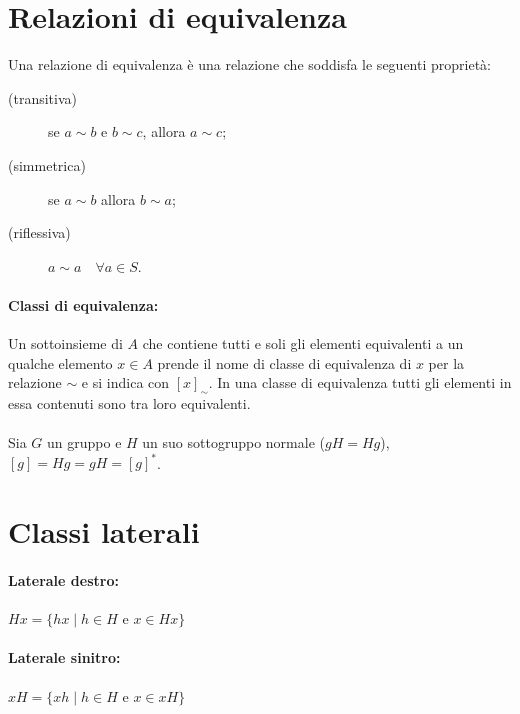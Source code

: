\documentclass[a4paper]{article}
\begin{document}
        \section*{Relazioni di equivalenza}
        Una relazione di equivalenza \`{e} una relazione che soddisfa le seguenti propriet\`{a}:
        \begin{description}
                \item[(transitiva)] se $a \sim b$ e $b \sim c$, allora $a \sim c$;
                \item[(simmetrica)] se $a \sim b$ allora $b \sim a$;
                \item[(riflessiva)] $a \sim a \quad \forall a \in S$.
        \end{description}

        \paragraph{Classi di equivalenza:}
        Un sottoinsieme di $A$ che contiene tutti e soli gli elementi equivalenti a un qualche elemento $x \in A$ prende il nome di classe di equivalenza di $x$ per la relazione $\sim$ e si indica con $[x]_\sim$.
        In una classe di equivalenza tutti gli elementi in essa contenuti sono tra loro equivalenti.

        \paragraph{}
        Sia $G$ un gruppo e $H$ un suo sottogruppo normale ($gH = Hg$), $[g] = Hg = gH = [g]^{*}$.


        \section*{Classi laterali}
        \paragraph{Laterale destro:}
        $Hx = \{ hx \mid h \in H \mbox{ e } x \in Hx \}$

        \paragraph{Laterale sinitro:}
        $xH = \{ xh \mid h \in H \mbox{ e } x \in xH \}$
\end{document}
